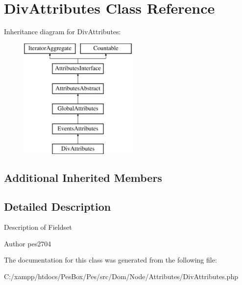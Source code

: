 \hypertarget{class_pes_1_1_dom_1_1_node_1_1_attributes_1_1_div_attributes}{}\section{Div\+Attributes Class Reference}
\label{class_pes_1_1_dom_1_1_node_1_1_attributes_1_1_div_attributes}
Inheritance diagram for Div\+Attributes\+:\begin{figure}[H]
\begin{center}
\leavevmode
\includegraphics[height=6.000000cm]{class_pes_1_1_dom_1_1_node_1_1_attributes_1_1_div_attributes}
\end{center}
\end{figure}
\subsection*{Additional Inherited Members}


\subsection{Detailed Description}
Description of Fieldset

\begin{DoxyAuthor}{Author}
pes2704 
\end{DoxyAuthor}


The documentation for this class was generated from the following file\+:\begin{DoxyCompactItemize}
\item 
C\+:/xampp/htdocs/\+Pes\+Box/\+Pes/src/\+Dom/\+Node/\+Attributes/Div\+Attributes.\+php\end{DoxyCompactItemize}
